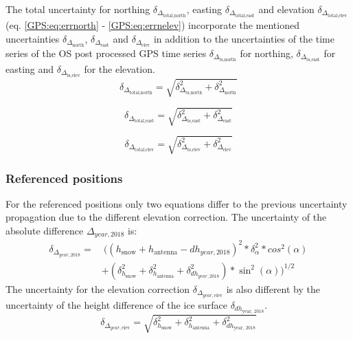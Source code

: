 The total uncertainty for northing $\delta_{\Delta_{\text{total,north}}}$, easting $\delta_{\Delta_{\text{total,east}}}$ and elevation $\delta_{\Delta_{\text{total,elev}}}$ (eq. \ref{GPS:eq:errnorth} - \ref{GPS:eq:errnelev}) incorporate the mentioned uncertainties $\delta_{\Delta_{\text{north}}}$, $\delta_{\Delta_{\text{east}}}$ and $\delta_{\Delta_{\text{elev}}}$ in addition to the uncertainties of the time series of the OS post processed GPS time series $\delta_{\Delta_{\text{ts,north}}}$ for northing, $\delta_{\Delta_{\text{ts,east}}}$ for easting and $\delta_{\Delta_{\text{ts,elev}}}$ for the elevation.
\begin{equation}
	\delta_{\Delta_{\text{total,north}}} = \sqrt{\delta_{\Delta_{\text{ts,north}}}^2 + \delta_{\Delta_{\text{north}}}^2}
	\label{GPS:eq:errnorth}
\end{equation}

\begin{equation}
	\delta_{\Delta_{\text{total,east}}} = \sqrt{\delta_{\Delta_{\text{ts,east}}}^2 + \delta_{\Delta_{\text{east}}}^2}
	\label{GPS:eq:erreast}
\end{equation}

\begin{equation}
	\delta_{\Delta_{\text{total,elev}}} = \sqrt{\delta_{\Delta_{\text{ts,elev}}}^2 +\delta_{\Delta_{\text{elev}}}^2}
	\label{GPS:eq:errnelev}
\end{equation}

\subsubsection*{Referenced positions}

For the referenced positions only two equations differ to the previous uncertainty propagation due to the different elevation correction. 
The uncertainty of the absolute difference $\Delta_{year,2018}$ is:
\begin{equation}
\begin{split}
\delta_{\Delta_{year,2018}} = & 
\ ((h_{\text{snow}} + h_{\text{antenna}} - dh_{year,2018})^2 * \delta_{\alpha}^2 * cos^2(\alpha)\\
&+ (\delta_{h_{\text{snow}}}^2 + \delta_{h_{\text{antenna}}}^2 + \delta_{dh_{year,2018}}^2) * \sin^2(\alpha))^{1/2}
\end{split}
\end{equation}
The uncertainty for the elevation correction $\delta_{\Delta_{year, \text{elev}}}$ is also different by the uncertainty of the height difference of the ice surface $\delta_{dh_{\text{year, 2018}}}$.
\begin{equation}
	\delta_{\Delta_{year, \text{elev}}} = \sqrt{\delta_{h_{\text{snow}}}^2 + \delta_{h_{\text{antenna}}}^2 + \delta_{dh_{\text{year, 2018}}}^2}
\end{equation}

